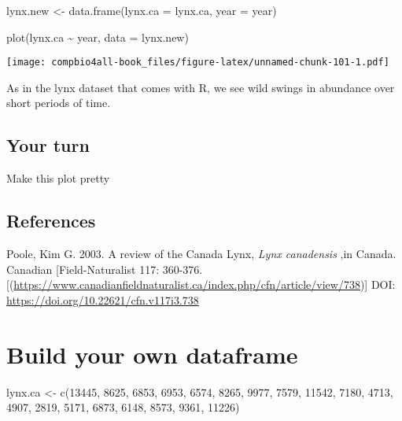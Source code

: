 \documentclass[
]{book}
\newenvironment{Shaded}{\begin{snugshade}}{\end{snugshade}}
\newcommand{\AttributeTok}[1]{\textcolor[rgb]{0.77,0.63,0.00}{#1}}
\newcommand{\DecValTok}[1]{\textcolor[rgb]{0.00,0.00,0.81}{#1}}
\newcommand{\FunctionTok}[1]{\textcolor[rgb]{0.00,0.00,0.00}{#1}}
\newcommand{\NormalTok}[1]{#1}
\newcommand{\OtherTok}[1]{\textcolor[rgb]{0.56,0.35,0.01}{#1}}
\newcommand{\SpecialCharTok}[1]{\textcolor[rgb]{0.00,0.00,0.00}{#1}}
\begin{document}
\begin{Shaded}
\begin{Highlighting}[]
\NormalTok{lynx.new }\OtherTok{\textless{}{-}} \FunctionTok{data.frame}\NormalTok{(}\AttributeTok{lynx.ca =}\NormalTok{ lynx.ca,}
                       \AttributeTok{year =}\NormalTok{ year)}
\end{Highlighting}
\end{Shaded}

\begin{Shaded}
\begin{Highlighting}[]
\FunctionTok{plot}\NormalTok{(lynx.ca }\SpecialCharTok{\textasciitilde{}}\NormalTok{ year, }\AttributeTok{data =}\NormalTok{ lynx.new)}
\end{Highlighting}
\end{Shaded}

\texttt{[image: compbio4all-book\_files/figure-latex/unnamed-chunk-101-1.pdf]}

As in the lynx dataset that comes with R, we see wild swings in abundance over short periods of time.

\hypertarget{your-turn-1}{%
\section{Your turn}\label{your-turn-1}}

Make this plot pretty

\hypertarget{references-1}{%
\section{References}\label{references-1}}

Poole, Kim G. 2003. A review of the Canada Lynx, \emph{Lynx canadensis} ,in Canada. Canadian {[}Field-Naturalist 117: 360-376.{[}(\url{https://www.canadianfieldnaturalist.ca/index.php/cfn/article/view/738}){]} DOI: \url{https://doi.org/10.22621/cfn.v117i3.738}

\hypertarget{build-your-own-dataframe-1}{%
\chapter{Build your own dataframe}\label{build-your-own-dataframe-1}}

\begin{Shaded}
\begin{Highlighting}[]
\NormalTok{lynx.ca }\OtherTok{\textless{}{-}} \FunctionTok{c}\NormalTok{(}\DecValTok{13445}\NormalTok{, }\DecValTok{8625}\NormalTok{, }\DecValTok{6853}\NormalTok{, }\DecValTok{6953}\NormalTok{, }\DecValTok{6574}\NormalTok{,}
  \DecValTok{8265}\NormalTok{, }\DecValTok{9977}\NormalTok{, }\DecValTok{7579}\NormalTok{, }\DecValTok{11542}\NormalTok{, }\DecValTok{7180}\NormalTok{,}
  \DecValTok{4713}\NormalTok{, }\DecValTok{4907}\NormalTok{, }\DecValTok{2819}\NormalTok{, }\DecValTok{5171}\NormalTok{, }\DecValTok{6873}\NormalTok{, }
  \DecValTok{6148}\NormalTok{, }\DecValTok{8573}\NormalTok{, }\DecValTok{9361}\NormalTok{, }\DecValTok{11226}\NormalTok{)}
\end{Highlighting}
\end{Shaded}
\end{document}
